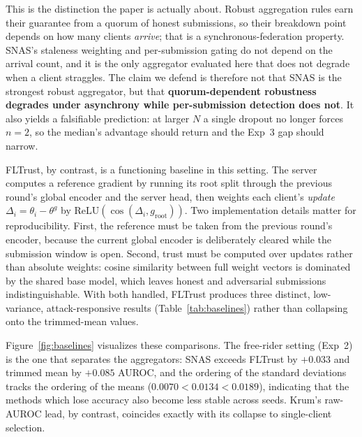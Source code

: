 \documentclass[pdflatex,sn-mathphys-num]{sn-jnl}
\begin{document}
This is the distinction the paper is actually about. Robust aggregation rules earn their guarantee from a quorum of honest submissions, so their breakdown point depends on how many clients \emph{arrive}; that is a synchronous-federation property. SNAS's staleness weighting and per-submission gating do not depend on the arrival count, and it is the only aggregator evaluated here that does not degrade when a client straggles. The claim we defend is therefore not that SNAS is the strongest robust aggregator, but that \textbf{quorum-dependent robustness degrades under asynchrony while per-submission detection does not}. It also yields a falsifiable prediction: at larger $N$ a single dropout no longer forces $n=2$, so the median's advantage should return and the Exp~3 gap should narrow.

FLTrust, by contrast, is a functioning baseline in this setting. The server computes a reference gradient by running its root split through the previous round's global encoder and the server head, then weights each client's \emph{update} $\Delta_i = \theta_i - \theta^g$ by $\mathrm{ReLU}(\cos(\Delta_i, g_{\mathrm{root}}))$. Two implementation details matter for reproducibility. First, the reference must be taken from the previous round's encoder, because the current global encoder is deliberately cleared while the submission window is open. Second, trust must be computed over updates rather than absolute weights: cosine similarity between full weight vectors is dominated by the shared base model, which leaves honest and adversarial submissions indistinguishable. With both handled, FLTrust produces three distinct, low-variance, attack-responsive results (Table~\ref{tab:baselines}) rather than collapsing onto the trimmed-mean values.

Figure~\ref{fig:baselines} visualizes these comparisons. The free-rider setting (Exp~2) is the one that separates the aggregators: SNAS exceeds FLTrust by $+0.033$ and trimmed mean by $+0.085$ AUROC, and the ordering of the standard deviations tracks the ordering of the means ($0.0070 < 0.0134 < 0.0189$), indicating that the methods which lose accuracy also become less stable across seeds. Krum's raw-AUROC lead, by contrast, coincides exactly with its collapse to single-client selection.
\end{document}
